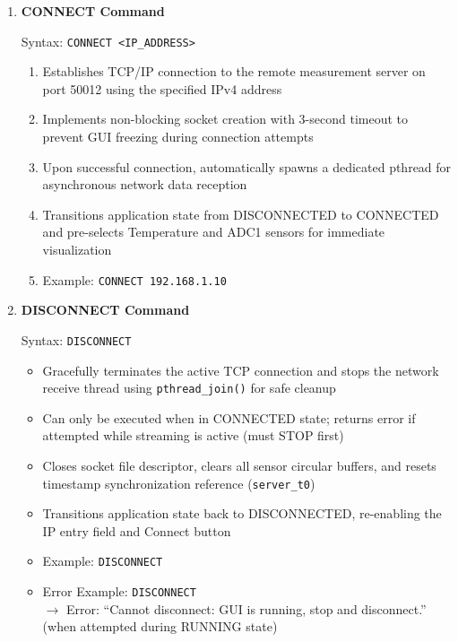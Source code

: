 \begin{enumerate}
    \item \textbf{CONNECT Command}

    Syntax: \texttt{CONNECT <IP\_ADDRESS>}

    \begin{enumerate}
        \item Establishes TCP/IP connection to the remote measurement server on port 50012 using the specified IPv4 address
        \item Implements non-blocking socket creation with 3-second timeout to prevent GUI freezing during connection attempts
        \item Upon successful connection, automatically spawns a dedicated pthread for asynchronous network data reception
        \item Transitions application state from DISCONNECTED to CONNECTED and pre-selects Temperature and ADC1 sensors for immediate visualization
        \item Example: \texttt{CONNECT 192.168.1.10}
    \end{enumerate}

    \item \textbf{DISCONNECT Command}

    Syntax: \texttt{DISCONNECT}

    \begin{itemize}
        \item Gracefully terminates the active TCP connection and stops the network receive thread using \texttt{pthread\_join()} for safe cleanup
        \item Can only be executed when in CONNECTED state; returns error if attempted while streaming is active (must STOP first)
        \item Closes socket file descriptor, clears all sensor circular buffers, and resets timestamp synchronization reference (\texttt{server\_t0})
        \item Transitions application state back to DISCONNECTED, re-enabling the IP entry field and Connect button
        \item Example: \texttt{DISCONNECT}
        \item Error Example: \texttt{DISCONNECT} \\
        \(\rightarrow\) Error: ``Cannot disconnect: GUI is running, stop and disconnect.'' \\
        (when attempted during RUNNING state)
    \end{itemize}


\end{enumerate}
